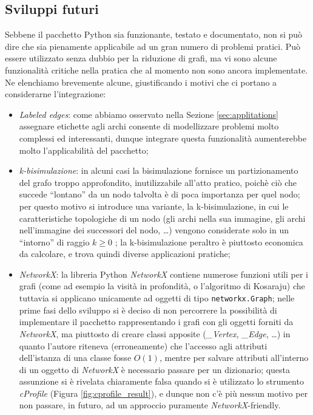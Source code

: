 \subsection{Sviluppi futuri}
Sebbene il pacchetto Python sia funzionante, testato e documentato, non si può dire che sia pienamente applicabile ad un gran numero di problemi pratici. Può essere utilizzato senza dubbio per la riduzione di grafi, ma vi sono alcune funzionalità critiche nella pratica che al momento non sono ancora implementate. Ne elenchiamo brevemente alcune, giustificando i motivi che ci portano a considerarne l'integrazione:
\begin{itemize}
    \item \emph{Labeled edges}: come abbiamo osservato nella Sezione \ref{sec:applitations} assegnare etichette agli archi consente di modellizzare problemi molto complessi ed interessanti, dunque integrare questa funzionalità aumenterebbe molto l'applicabilità del pacchetto;
    \item \emph{k-bisimulazione}: in alcuni casi la bisimulazione fornisce un partizionamento del grafo troppo approfondito, inutilizzabile all'atto pratico, poichè ciò che succede ``lontano'' da un nodo talvolta è di poca importanza per quel nodo; per questo motivo si introduce una variante, la k-bisimulazione, in cui le caratteristiche topologiche di un nodo (gli archi nella sua immagine, gli archi nell'immagine dei successori del nodo, \dots) vengono considerate solo in un ``intorno'' di raggio $k \geq 0$ \cite{kbisi}; la k-bisimulazione peraltro è piuttosto economica da calcolare, e trova quindi diverse applicazioni pratiche;
    \item \emph{NetworkX}: la libreria Python \emph{NetworkX} contiene numerose funzioni utili per i grafi (come ad esempio la visità in profondità, o l'algoritmo di Kosaraju) che tuttavia si applicano unicamente ad oggetti di tipo \verb|networkx.Graph|; nelle prime fasi dello sviluppo si è deciso di non percorrere la possibilità di implementare il pacchetto rappresentando i grafi con gli oggetti forniti da \emph{NetworkX}, ma piuttosto di creare classi apposite (\emph{\_Vertex, \_Edge}, \dots) in quanto l'autore riteneva (erroneamente) che l'accesso agli attributi dell'istanza di una classe fosse $O(1)$, mentre per salvare attributi all'interno di un oggetto di \emph{NetworkX} è necessario passare per un dizionario; questa assunzione si è rivelata chiaramente falsa quando si è utilizzato lo strumento \emph{cProfile} (Figura \ref{fig:cprofile_result}), e dunque non c'è più nessun motivo per non passare, in futuro, ad un approccio puramente \emph{NetworkX}-friendly.
\end{itemize}

